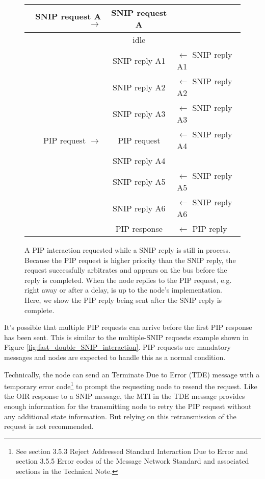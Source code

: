 \documentclass[11pt]{article}
\begin{document}
\begin{figure}[!htbp]
\begin{center}
\begin{tabular}{ r | c | l}
\hline
SNIP request A $\rightarrow$ & SNIP request A & \\ \hline

    & idle & \\ \hline

    & SNIP reply A1  & $\leftarrow$ SNIP reply A1 \\ \hline
    & SNIP reply A2  & $\leftarrow$ SNIP reply A2 \\ \hline
    & SNIP reply A3  & $\leftarrow$ SNIP reply A3 \\ \hline
PIP request $\rightarrow$ & PIP request & $\leftarrow$ SNIP reply A4\\ \hline
    & SNIP reply A4  & \\ \hline
    & SNIP reply A5  & $\leftarrow$ SNIP reply A5 \\ \hline
    & SNIP reply A6  & $\leftarrow$ SNIP reply A6 \\ \hline
    & PIP response   & $\leftarrow$ PIP reply     \\ \hline
\end{tabular}
\end{center}
\caption{A PIP interaction requested while a SNIP reply is still in process.
Because the PIP request is higher priority than the SNIP reply, the request
successfully arbitrates and appears on the bus before the reply is completed.
When the node replies to the PIP request, e.g. right away or after a delay, 
is up to the node's implementation.
Here, we show the PIP reply being sent after the SNIP
reply is complete.}
\label{fig:normal_SNIP_PIP_interaction}
\end{figure}

\cbstart
It's possible that multiple PIP requests can arrive before the 
first PIP response has been sent.  
This is similar to the multiple-SNIP requests
example shown in Figure \ref{fig:fast_double_SNIP_interaction}.
PIP requests are mandatory messages and 
nodes are expected to handle this as a normal condition.

Technically, the node can send an Terminate Due to Error (TDE)
message with a temporary error 
code\footnote{
    See section 3.5.3 Reject Addressed Standard Interaction Due to Error
    and section 3.5.5 Error codes
    of the Message Network Standard and associated sections
    in the Technical Note. 
}
to prompt the requesting node to resend the 
request. Like the OIR response to a SNIP
message, the MTI in the TDE message provides
enough information for the transmitting node to 
retry the PIP request without any additional state information.
But relying on this retransmission of the request is not recommended.
\end{document}

